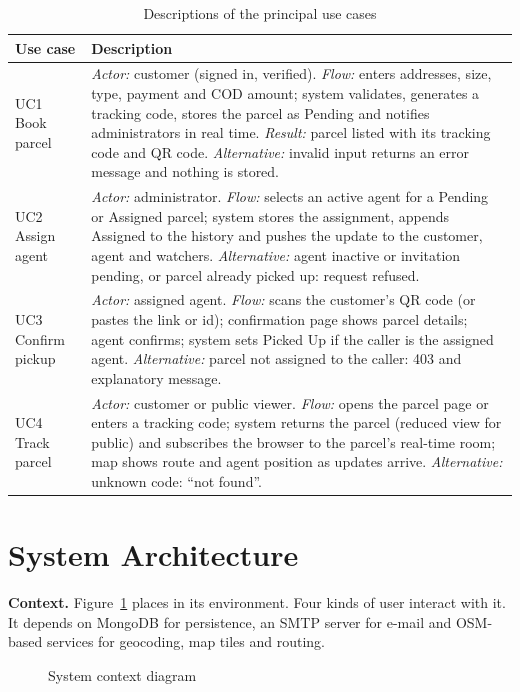 \begin{table}[htbp]
\centering
\caption{Descriptions of the principal use cases}
\label{tab:uc}
\small
\begin{tabularx}{\textwidth}{@{}P{2.4cm}L@{}}
\toprule
\textbf{Use case} & \textbf{Description} \\
\midrule
UC1 Book parcel & \emph{Actor:} customer (signed in, verified). \emph{Flow:} enters addresses, size, type, payment and COD amount; system validates, generates a tracking code, stores the parcel as Pending and notifies administrators in real time. \emph{Result:} parcel listed with its tracking code and QR code. \emph{Alternative:} invalid input returns an error message and nothing is stored. \\
UC2 Assign agent & \emph{Actor:} administrator. \emph{Flow:} selects an active agent for a Pending or Assigned parcel; system stores the assignment, appends Assigned to the history and pushes the update to the customer, agent and watchers. \emph{Alternative:} agent inactive or invitation pending, or parcel already picked up: request refused. \\
UC3 Confirm pickup & \emph{Actor:} assigned agent. \emph{Flow:} scans the customer's QR code (or pastes the link or id); confirmation page shows parcel details; agent confirms; system sets Picked Up if the caller is the assigned agent. \emph{Alternative:} parcel not assigned to the caller: 403 and explanatory message. \\
UC4 Track parcel & \emph{Actor:} customer or public viewer. \emph{Flow:} opens the parcel page or enters a tracking code; system returns the parcel (reduced view for public) and subscribes the browser to the parcel's real-time room; map shows route and agent position as updates arrive. \emph{Alternative:} unknown code: ``not found''. \\
\bottomrule
\end{tabularx}
\end{table}

\section{System Architecture}
\label{sec:architecture}

\textbf{Context.} Figure~\ref{fig:context} places \scpms{} in its environment. Four kinds of user interact with it. It depends on MongoDB for persistence, an SMTP server for e-mail and OSM-based services for geocoding, map tiles and routing.

\begin{figure}[htbp]
\centering
\resizebox{0.95\textwidth}{!}{}
\caption{System context diagram}
\label{fig:context}
\end{figure}

